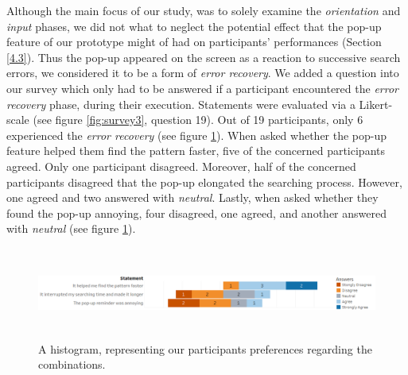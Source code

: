 Although the main focus of our study, was to solely examine the \textit{orientation} and \textit{input} phases, we did not what to neglect the potential effect that the pop-up feature of our prototype might of had on participants' performances (Section \ref{4.3}). Thus the pop-up appeared on the screen as a reaction to successive search errors, we considered it to be a form of \textit{error recovery}. We added a question into our survey which only had to be answered if a participant encountered the \textit{error recovery} phase, during their execution. Statements were evaluated via a Likert-scale (see figure \ref{fig:survey3}, question 19). Out of 19 participants, only 6 experienced the \textit{error recovery} (see figure \ref{fig:error}). When asked whether the pop-up feature helped them find the pattern faster, five of the concerned participants agreed. Only one participant disagreed. Moreover, half of the concerned participants disagreed that the pop-up elongated the searching process. However, one agreed and two answered with \textit{neutral}. Lastly, when asked whether they found the pop-up annoying, four disagreed, one agreed, and another answered with \textit{neutral} (see figure \ref{fig:error}). \\


\begin{figure}[t!]
\centering
\includegraphics[width=15cm, height=3cm]{Chapters/graphics/ErrorRecovery.png}
\caption{A histogram, representing our participants preferences regarding the combinations.}
\label{fig:error}
\end{figure}





